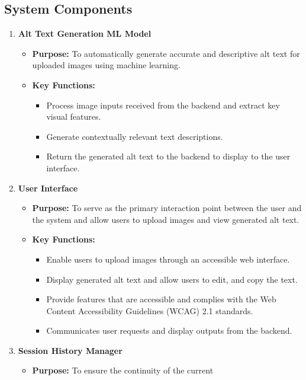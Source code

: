 \documentclass{article}
\begin{document}
\subsection{System Components}
\begin{enumerate}
  \item \textbf{Alt Text Generation ML Model}
    \begin{itemize}
      \item \textbf{Purpose:} To automatically generate accurate and
        descriptive alt text for uploaded images using machine learning.
      \item \textbf{Key Functions:}
        \begin{itemize}
          \item Process image inputs received from the backend and
            extract key visual features.
          \item Generate contextually relevant text descriptions.
          \item Return the generated alt text to the backend
            to display to the user interface.
        \end{itemize}
    \end{itemize}
  \item \textbf{User Interface}
    \begin{itemize}
      \item \textbf{Purpose:} To serve as the primary interaction
        point between the user and the system and allow users to
        upload images and view generated alt text.
      \item \textbf{Key Functions:}
        \begin{itemize}
          \item Enable users to upload images through an accessible
            web interface.
          \item Display generated alt text and allow users to edit, and 
            copy the text.
          \item Provide features that are accessible and complies
            with the Web Content Accessibility Guidelines (WCAG) 2.1 standards.
          \item Communicates user requests and display outputs from the backend.
        \end{itemize}
    \end{itemize}
  \item \textbf{Session History Manager}
    \begin{itemize}
      \item \textbf{Purpose:} To ensure the continuity of the current

\end{itemize}
\end{enumerate}
\end{document}
